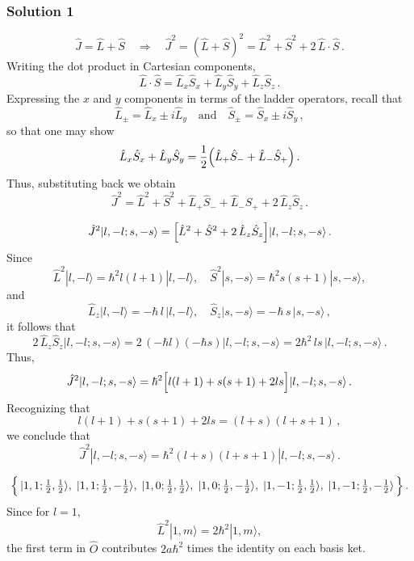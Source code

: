 \documentclass{article}
\begin{document}
\subsubsection{Solution 1}
\[
\hat{J} = \hat{L} + \hat{S} \quad \Longrightarrow \quad \hat{J}^2 = (\hat{L}+\hat{S})^2 = \hat{L}^2 + \hat{S}^2 + 2\,\hat{L}\cdot\hat{S}\,.
\]
Writing the dot product in Cartesian components,
\[
\hat{L}\cdot\hat{S} = \hat{L}_x\hat{S}_x + \hat{L}_y\hat{S}_y + \hat{L}_z\hat{S}_z\,.
\]
Expressing the \(x\) and \(y\) components in terms of the ladder operators, recall that
\[
\hat{L}_\pm = \hat{L}_x \pm i \hat{L}_y \quad \text{and} \quad \hat{S}_\pm = \hat{S}_x \pm i \hat{S}_y\,,
\]
so that one may show
\[
\hat{L}_x\hat{S}_x + \hat{L}_y\hat{S}_y = \frac{1}{2}\Bigl(\hat{L}_+\hat{S}_- + \hat{L}_-\hat{S}_+\Bigr)\,.
\]
Thus, substituting back we obtain
\[
\hat{J}^2 = \hat{L}^2 + \hat{S}^2 + \hat{L}_+\hat{S}_- + \hat{L}_-\hat{S}_+ + 2\,\hat{L}_z\hat{S}_z\,.
\]

\[
\hat{J}^2|l,-l;s,-s\rangle = \Bigl[\hat{L}^2 + \hat{S}^2 + 2\,\hat{L}_z\hat{S}_z\Bigr]|l,-l;s,-s\rangle\,.
\]
Since
\[
\hat{L}^2|l,-l\rangle = \hbar^2 l(l+1)|l,-l\rangle,\quad \hat{S}^2|s,-s\rangle = \hbar^2 s(s+1)|s,-s\rangle,
\]
and
\[
\hat{L}_z|l,-l\rangle = -\hbar\,l\,|l,-l\rangle,\quad \hat{S}_z|s,-s\rangle = -\hbar\,s\,|s,-s\rangle\,,
\]
it follows that
\[
2\,\hat{L}_z\hat{S}_z|l,-l;s,-s\rangle = 2\,(-\hbar l)(-\hbar s)|l,-l;s,-s\rangle = 2\hbar^2\,l s\,|l,-l;s,-s\rangle\,.
\]
Thus,
\[
\hat{J}^2|l,-l;s,-s\rangle = \hbar^2\Bigl[l(l+1) + s(s+1) + 2ls\Bigr] |l,-l;s,-s\rangle\,.
\]
Recognizing that
\[
l(l+1) + s(s+1) + 2ls = (l+s)(l+s+1)\,,
\]
we conclude that
\[
\hat{J}^2|l,-l;s,-s\rangle = \hbar^2 (l+s)(l+s+1)|l,-l;s,-s\rangle\,.
\]

\[
\Bigl\{\,|1,1;\tfrac{1}{2},\tfrac{1}{2}\rangle,\; |1,1;\tfrac{1}{2},-\tfrac{1}{2}\rangle,\; |1,0;\tfrac{1}{2},\tfrac{1}{2}\rangle,\; |1,0;\tfrac{1}{2},-\tfrac{1}{2}\rangle,\; |1,-1;\tfrac{1}{2},\tfrac{1}{2}\rangle,\; |1,-1;\tfrac{1}{2},-\tfrac{1}{2}\rangle\,\Bigr\}\,.
\]
Since for \(l=1\),
\[
\hat{L}^2|1,m\rangle = 2\hbar^2|1,m\rangle,
\]
the first term in \(\hat{O}\) contributes \(2a\hbar^2\) times the identity on each basis ket.
\end{document}
